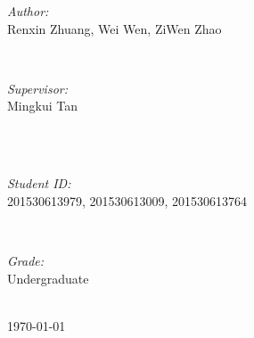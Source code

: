 \documentclass[journal, a4paper]{IEEEtran}
\begin{document}
\begin{titlepage}
\begin{minipage}{0.4\textwidth}
\begin{flushleft} \large
\emph{Author:}\\
Renxin Zhuang, Wei Wen, ZiWen Zhao %
\end{flushleft}
\end{minipage}
~
\begin{minipage}{0.4\textwidth}
\begin{flushright} \large
\emph{Supervisor:} \\
Mingkui Tan %
\end{flushright}
\end{minipage}\\[2cm]
~
\begin{minipage}{0.4\textwidth}
\begin{flushleft} \large
\emph{Student ID:}\\
201530613979, 201530613009, 201530613764
\end{flushleft}
\end{minipage}
~
\begin{minipage}{0.4\textwidth}
\begin{flushright} \large
\emph{Grade:} \\
Undergraduate
\end{flushright}
\end{minipage}\\[2cm]



{\large \today}\\[2cm] %

 

\vfill %

\end{titlepage}

\end{document}
